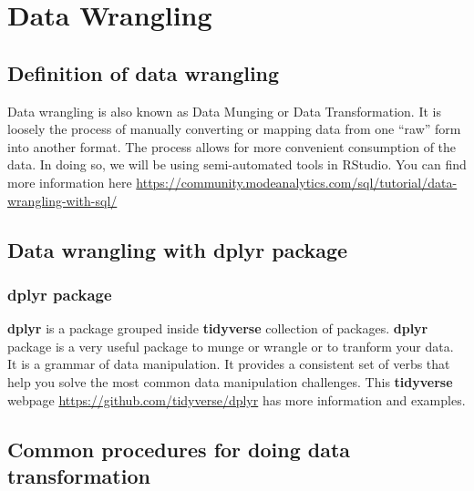 \documentclass[
]{book}
\begin{document}
\hypertarget{data-wrangling}{%
\chapter{Data Wrangling}\label{data-wrangling}}

\hypertarget{definition-of-data-wrangling}{%
\section{Definition of data wrangling}\label{definition-of-data-wrangling}}

Data wrangling is also known as Data Munging or Data Transformation. It is loosely the process of manually converting or mapping data from one ``raw'' form into another format. The process allows for more convenient consumption of the data. In doing so, we will be using semi-automated tools in RStudio. You can find more information here \url{https://community.modeanalytics.com/sql/tutorial/data-wrangling-with-sql/}

\hypertarget{data-wrangling-with-dplyr-package}{%
\section{\texorpdfstring{Data wrangling with \textbf{dplyr} package}{Data wrangling with dplyr package}}\label{data-wrangling-with-dplyr-package}}

\hypertarget{dplyr-package}{%
\subsection{\texorpdfstring{\textbf{dplyr} package}{dplyr package}}\label{dplyr-package}}

\textbf{dplyr} is a package grouped inside \textbf{tidyverse} collection of packages. \textbf{dplyr} package is a very useful package to munge or wrangle or to tranform your data. It is a grammar of data manipulation. It provides a consistent set of verbs that help you solve the most common data manipulation challenges. This \textbf{tidyverse} webpage \url{https://github.com/tidyverse/dplyr} has more information and examples.

\hypertarget{common-procedures-for-doing-data-transformation}{%
\section{Common procedures for doing data transformation}\label{common-procedures-for-doing-data-transformation}}
\end{document}
